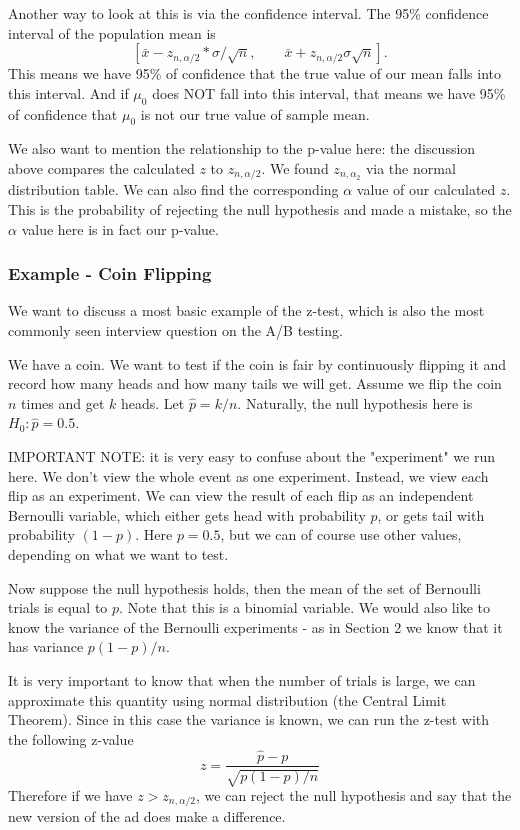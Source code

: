 \documentclass[12pt]{amsart}
\numberwithin{equation}{section}
\theoremstyle{plain}
\theoremstyle{definition}
\begin{document}
Another way to look at this is via the confidence interval. The 95\% confidence interval of the population mean is 
$$
[\bar x-z_{n,\alpha/2}*\sigma/\sqrt{n}, \qquad\bar x+z_{n,\alpha/2}\sigma\sqrt{n}].
$$
This means we have 95\% of confidence that the true value of our mean falls into this interval. And if $\mu_0$ does NOT fall into this interval, that means we have 95\% of confidence that $\mu_0$ is not our true value of sample mean.

We also want to mention the relationship to the p-value here: the discussion above compares the calculated $z$ to $z_{n,\alpha/2}$. We found $z_{n,\alpha_2}$ via the normal distribution table. We can also find the corresponding $\alpha$ value of our calculated $z$. This is the probability of rejecting the null hypothesis and made a mistake, so the $\alpha$ value here is in fact our p-value.

\subsubsection{Example - Coin Flipping}

We want to discuss a most basic example of the z-test, which is also the most commonly seen interview question on the A/B testing. 

We have a coin. We want to test if the coin is fair by continuously flipping it and record how many heads and how many tails we will get. Assume we flip the coin $n$ times and get $k$ heads. Let $\hat p = k/n$. Naturally, the null hypothesis here is $H_0: \hat p = 0.5$.

IMPORTANT NOTE: it is very easy to confuse about the "experiment" we run here. We don't view the whole event as one experiment. Instead, we view each flip as an experiment. We can view the result of each flip as an independent Bernoulli variable, which either gets head with probability $p$, or gets tail with probability $(1-p)$. Here $p=0.5$, but we can of course use other values, depending on what we want to test.

Now suppose the null hypothesis holds, then the mean of the set of Bernoulli trials is equal to $p$. Note that this is a binomial variable. We would also like to know the variance of the Bernoulli experiments - as in Section 2 we know that it has variance $p(1-p)/n$.

It is very important to know that when the number of trials is large, we can approximate this quantity using normal distribution (the Central Limit Theorem). Since in this case the variance is known, we can run the z-test with the following z-value
$$
z = \frac{\hat p-p}{\sqrt{p(1-p)/n}}
$$
Therefore if we have $z>z_{n,\alpha/2}$, we can reject the null hypothesis and say that the new version of the ad does make a difference.
\end{document}
